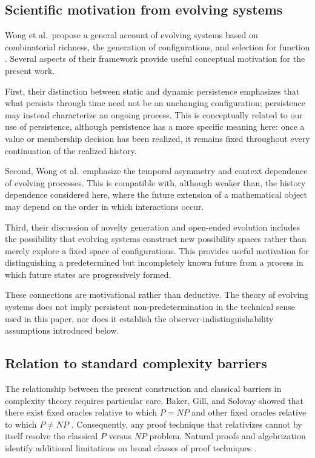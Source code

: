 \documentclass[11pt]{article}
\begin{document}
\subsection{Scientific motivation from evolving systems}

Wong et al.\ propose a general account of evolving systems based on combinatorial richness,
the generation of configurations, and selection for function \cite{WongEtAl2023}.  Several
aspects of their framework provide useful conceptual motivation for the present work.

First, their distinction between static and dynamic persistence emphasizes that what persists
through time need not be an unchanging configuration; persistence may instead characterize an
ongoing process.  This is conceptually related to our use of persistence, although persistence
has a more specific meaning here: once a value or membership decision has been realized, it
remains fixed throughout every continuation of the realized history.

Second, Wong et al.\ emphasize the temporal asymmetry and context dependence of evolving
processes.  This is compatible with, although weaker than, the history dependence considered
here, where the future extension of a mathematical object may depend on the order in which
interactions occur.

Third, their discussion of novelty generation and open-ended evolution includes the
possibility that evolving systems construct new possibility spaces rather than merely explore
a fixed space of configurations.  This provides useful motivation for distinguishing a
predetermined but incompletely known future from a process in which future states are
progressively formed.

These connections are motivational rather than deductive.  The theory of evolving systems
does not imply persistent non-predetermination in the technical sense used in this paper, nor
does it establish the observer-indistinguishability assumptions introduced below.

\subsection{Relation to standard complexity barriers}

The relationship between the present construction and classical barriers in complexity theory
requires particular care.  Baker, Gill, and Solovay showed that there exist fixed oracles
relative to which \(P=NP\) and other fixed oracles relative to which \(P\neq NP\)
\cite{BakerGillSolovay1975}.  Consequently, any proof technique that relativizes cannot by
itself resolve the classical \(P\) versus \(NP\) problem.  Natural proofs and algebrization
identify additional limitations on broad classes of proof techniques
\cite{RazborovRudich1997,AaronsonWigderson2009}.
\end{document}
